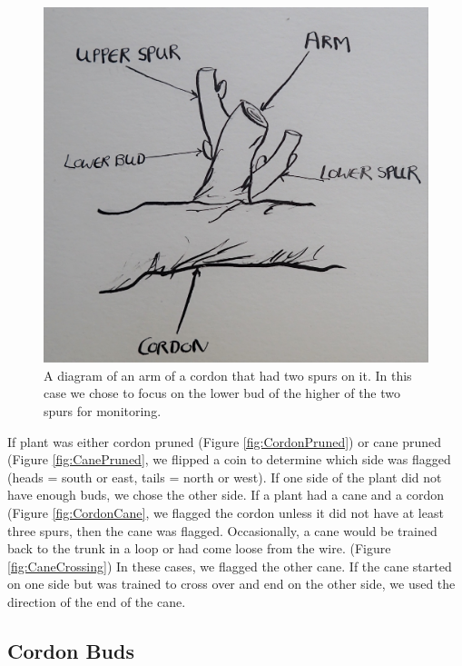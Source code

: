 \documentclass[11pt,letter]{article}
\begin{document}
\begin{figure}%
  \includegraphics[width=\linewidth]{TwoSpurs.jpg}
  \caption{A diagram of an arm of a cordon that had two spurs on it. In this case we chose to focus on the lower bud of the higher of the two spurs for monitoring. }
  \label{fig:TwoSpurs}
\end{figure}



If plant was either cordon pruned (Figure \ref{fig:CordonPruned}) or cane pruned (Figure \ref{fig:CanePruned}, we flipped a coin to determine which side was flagged (heads = south or east, tails = north or west). If one side of the plant did not have enough buds, we chose the other side. If a plant had a cane and a cordon (Figure \ref{fig:CordonCane}, we flagged the cordon unless it did not have at least three spurs, then the cane was flagged. Occasionally, a cane would be trained back to the trunk in a loop or had come loose from the wire. (Figure \ref{fig:CaneCrossing}) In these cases, we flagged the other cane. If the cane started on one side but was trained to cross over and end on the other side, we used the direction of the end of the cane. 


\subsection{Cordon Buds}
\end{document}
